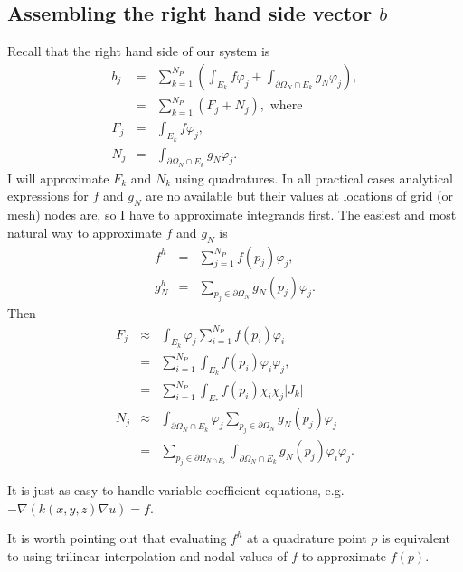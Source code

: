 \documentclass{article}
\begin{document}
\subsection{Assembling the right hand side vector $b$}

Recall that the right hand side of our system is
\begin{eqnarray}
  b_j & = & \sum_{k = 1}^{N_P} \left(\int_{E_k} f \varphi_j + \int_{\partial
  \Omega_N \cap E_k} g_N \varphi_j \right), \nonumber\\
  & = & \sum_{k = 1}^{N_P} (F_j + N_j), \text{ where} \nonumber\\
  F_j & = & \int_{E_k} f \varphi_j,  \label{eq:force}\\
  N_j & = & \int_{\partial \Omega_N \cap E_k} g_N \varphi_j .
  \label{eq:neumann}
\end{eqnarray}
I will approximate $F_k$ and $N_k$ using quadratures. In all practical cases
analytical expressions for $f$ and $g_{N}$ are no available but their values at locations of grid
(or mesh) nodes are, so I have to approximate integrands first. The easiest and
most natural way to approximate $f$ and $g_N$ is
\begin{eqnarray*}
  f^h & = & \sum_{j = 1}^{N_P} f (p_j) \varphi_j,\\
  g^h_N & = & \sum_{p_j \in \partial \Omega_N} g_N (p_j) \varphi_j .
\end{eqnarray*}
Then
\begin{eqnarray}
  F_j & \approx & \int_{E_k} \varphi_j \sum_{i = 1}^{N_P} f (p_i) \varphi_i
  \nonumber\\
  & = & \sum_{i = 1}^{N_P} \int_{E_k} f (p_i) \varphi_i \varphi_j,
  \label{eq:forcefinal}\\
  & = & \sum_{i = 1}^{N_P} \int_{E_{\ast}} f (p_i) \chi_i \chi_j  | J_k |
  \nonumber\\
  N_j & \approx & \int_{\partial \Omega_N \cap E_k} \varphi_j \sum_{p_j \in
  \partial \Omega_N} g_N (p_j) \varphi_j \nonumber\\
  & = & \sum_{p_j \in \partial \Omega_{N \cap E_k}} \int_{\partial \Omega_N
  \cap E_k} g_N (p_j) \varphi_i \varphi_j .  \label{eq:neumannfinal}
\end{eqnarray}
\begin{note}
  It is just as easy to handle variable-coefficient equations, e.g. $- \nabla
  (k (x, y, z) \nabla u) = f$.
\end{note}

\begin{remark}
  It is worth pointing out that evaluating $f^h$ at a quadrature point $p$ is
  equivalent to using trilinear interpolation and nodal values of $f$ to
  approximate $f (p)$.
\end{remark}
\end{document}
